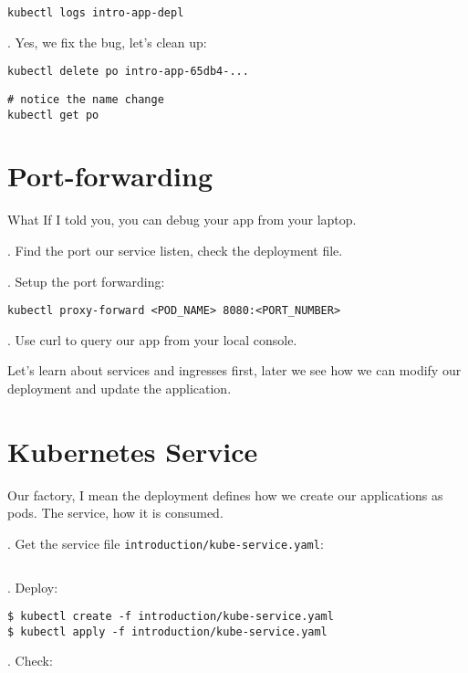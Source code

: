 \documentclass[12pt, letterpaper]{article}
\begin{document}
\begin{verbatim}
kubectl logs intro-app-depl
\end{verbatim}

. Yes, we fix the bug, let's clean up:

\begin{verbatim}
kubectl delete po intro-app-65db4-...
\end{verbatim}


\begin{verbatim}
# notice the name change
kubectl get po
\end{verbatim}

%
%
%
\section{Port-forwarding}

What If I told you, you can debug your app from your laptop.

. Find the port our service listen, check the deployment file.

. Setup the port forwarding:

\begin{verbatim}
kubectl proxy-forward <POD_NAME> 8080:<PORT_NUMBER>
\end{verbatim}

. Use curl to query our app from your local console.

\bigskip
Let's learn about services and ingresses first, later 
we see how we can modify our deployment and update the application.

%
%
%
\pagebreak
\section{Kubernetes Service}

Our factory, I mean the deployment defines how we create our applications as pods. The service, how it is consumed.

. Get the service file \texttt{introduction/kube-service.yaml}:

\inputminted{yaml}{introduction/kube-service.yaml}

. Deploy:

\begin{verbatim}
$ kubectl create -f introduction/kube-service.yaml
$ kubectl apply -f introduction/kube-service.yaml
\end{verbatim}

. Check:
\end{document}
